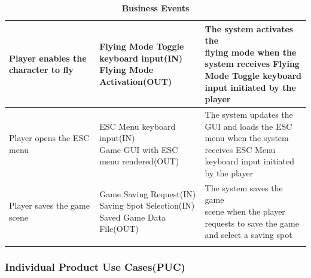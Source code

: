 \documentclass[12pt, titlepage]{article}
\begin{document}
\begin{center}
\begin{longtable}[!bpht]{|m{0.3\linewidth}|m{0.35\linewidth}|m{0.35\linewidth}|}
\makecell[ml]{Player enables the\\ character to fly} & \makecell[ml]{Flying Mode Toggle\\ keyboard input(IN) \\Flying Mode\\ Activation(OUT)} & \makecell[ml]{The system activates the\\ flying mode when the\\ system receives Flying\\ Mode Toggle keyboard\\ input initiated by the\\ player}\\\hline

\makecell[ml]{Player opens the ESC\\ menu} & \makecell[ml]{ESC Menu keyboard\\ input(IN)\\ Game GUI with ESC\\ menu rendered(OUT)} & \makecell[ml]{The system updates the\\ GUI and loads the ESC\\ menu when the system\\ receives ESC Menu\\ keyboard input initiated\\ by the player}\\\hline

\makecell[ml]{Player saves the game\\ scene} & \makecell[ml]{Game Saving Request(IN)\\ Saving Spot Selection(IN)\\ Saved Game Data\\ File(OUT)} & \makecell[ml]{The system saves the game\\ scene when the player\\ requests to save the game\\ and select a saving spot} \\\hline
\caption{\bf{Business Events}}
\end{longtable}
\end{center}
\FloatBarrier
\subsubsection{Individual Product Use Cases(PUC)}
\end{document}

